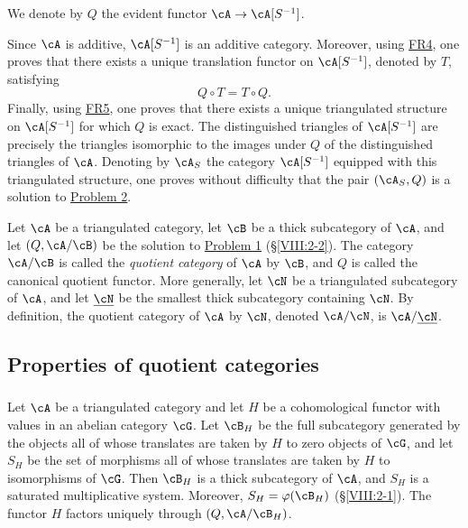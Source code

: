 We denote by $Q$ the evident functor $\cA\to \cA[S^{-1}]$.

Since $\cA$ is additive, $\cA[S^{-1}]$ is an additive category. Moreover,
using \hyperlink{VIII:FR4}{FR4}, one proves that there exists a unique
translation functor on $\cA[S^{-1}]$, denoted by $T$, satisfying
\[
  Q\circ T = T\circ Q \text{.}
\]
Finally, using \hyperlink{VIII:FR5}{FR5}, one proves that there exists a
unique triangulated structure on $\cA[S^{-1}]$ for which $Q$ is exact.
The distinguished triangles of $\cA[S^{-1}]$ are precisely the triangles
isomorphic to the images under $Q$ of the distinguished triangles of
$\cA$. Denoting by $\cA_S$ the category $\cA[S^{-1}]$ equipped with this
triangulated structure, one proves without difficulty that the pair
$(\cA_S,Q)$ is a solution to \hyperlink{VIII:prob2}{Problem 2}.

\begin{definition}\label{VIII:2-3-3}
Let $\cA$ be a triangulated category, let $\cB$ be a thick subcategory of
$\cA$, and let $(Q,\cA/\cB)$ be the solution to
\hyperlink{VIII:prob1}{Problem 1} (\S \ref{VIII:2-2}). The category
$\cA/\cB$ is called the \emph{quotient category} of $\cA$ by $\cB$, and
$Q$ is called the canonical quotient functor. More generally, let $\cN$
be a triangulated subcategory of $\cA$, and let $\underline\cN$ be the
smallest thick subcategory containing $\cN$. By definition, the quotient
category of $\cA$ by $\cN$, denoted $\cA/\cN$, is
$\cA/\underline\cN$.
\end{definition}

\subsection{Properties of quotient categories}\label{VIII:2-4}

\subsubsection{}\label{VIII:2-4-1}

Let $\cA$ be a triangulated category and let $H$ be a cohomological functor
with values in an abelian category $\cG$. Let $\cB_H$ be the full
subcategory generated by the objects all of whose translates are taken by
$H$ to zero objects of $\cG$, and let $S_H$ be the set of morphisms all of
whose translates are taken by $H$ to isomorphisms of $\cG$. Then $\cB_H$
is a thick subcategory of $\cA$, and $S_H$ is a saturated multiplicative
system. Moreover, $S_H=\varphi(\cB_H)$ (\S \ref{VIII:2-1}). The functor
$H$ factors uniquely through $(Q,\cA/\cB_H)$.

